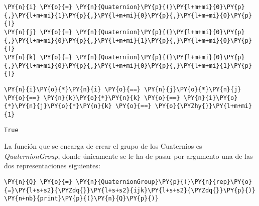 \begin{itemize}
\begin{itemize}
    \begin{tcolorbox}[breakable, size=fbox, boxrule=1pt, pad at break*=1mm,colback=cellbackground, colframe=cellborder]
\begin{Verbatim}[commandchars=\\\{\}]
\PY{n}{i} \PY{o}{=} \PY{n}{Quaternion}\PY{p}{(}\PY{l+m+mi}{0}\PY{p}{,}\PY{l+m+mi}{1}\PY{p}{,}\PY{l+m+mi}{0}\PY{p}{,}\PY{l+m+mi}{0}\PY{p}{)}
\PY{n}{j} \PY{o}{=} \PY{n}{Quaternion}\PY{p}{(}\PY{l+m+mi}{0}\PY{p}{,}\PY{l+m+mi}{0}\PY{p}{,}\PY{l+m+mi}{1}\PY{p}{,}\PY{l+m+mi}{0}\PY{p}{)}
\PY{n}{k} \PY{o}{=} \PY{n}{Quaternion}\PY{p}{(}\PY{l+m+mi}{0}\PY{p}{,}\PY{l+m+mi}{0}\PY{p}{,}\PY{l+m+mi}{0}\PY{p}{,}\PY{l+m+mi}{1}\PY{p}{)}
\end{Verbatim}
\end{tcolorbox}

    \begin{tcolorbox}[breakable, size=fbox, boxrule=1pt, pad at break*=1mm,colback=cellbackground, colframe=cellborder]
\begin{Verbatim}[commandchars=\\\{\}]
\PY{n}{i}\PY{o}{*}\PY{n}{i} \PY{o}{==} \PY{n}{j}\PY{o}{*}\PY{n}{j} \PY{o}{==} \PY{n}{k}\PY{o}{*}\PY{n}{k} \PY{o}{==} \PY{n}{i}\PY{o}{*}\PY{n}{j}\PY{o}{*}\PY{n}{k} \PY{o}{==} \PY{o}{\PYZhy{}}\PY{l+m+mi}{1}
\end{Verbatim}
\end{tcolorbox}

\begin{tcolorbox}[breakable, size=fbox, boxrule=.5pt, pad at break*=1mm, opacityfill=0]
\begin{Verbatim}[commandchars=\\\{\}]
True
\end{Verbatim}
\end{tcolorbox}
        
    La función que se encarga de crear el grupo de los Cuaternios es
\textit{QuaternionGroup}, donde únicamente se le ha de pasar por argumento
una de las dos representaciones siguientes:

    \begin{tcolorbox}[breakable, size=fbox, boxrule=1pt, pad at break*=1mm,colback=cellbackground, colframe=cellborder]
\begin{Verbatim}[commandchars=\\\{\}]
\PY{n}{Q} \PY{o}{=} \PY{n}{QuaternionGroup}\PY{p}{(}\PY{n}{rep}\PY{o}{=}\PY{l+s+s2}{\PYZdq{}}\PY{l+s+s2}{ijk}\PY{l+s+s2}{\PYZdq{}}\PY{p}{)}
\PY{n+nb}{print}\PY{p}{(}\PY{n}{Q}\PY{p}{)}
\end{Verbatim}
\end{tcolorbox}


\end{itemize}
\end{itemize}
